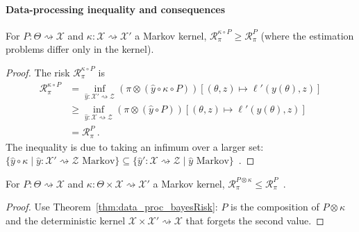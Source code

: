 \paragraph{Data-processing inequality and consequences}

\begin{theorem}
  \label{thm:data_proc_bayesRisk}
  \mathlibok
  For $P : \Theta \rightsquigarrow \mathcal X$ and $\kappa : \mathcal X \rightsquigarrow \mathcal X'$ a Markov kernel, $\mathcal R^{\kappa \circ P}_\pi \ge \mathcal R^{P}_\pi$ (where the estimation problems differ only in the kernel).
\end{theorem}

\begin{proof}\mathlibok
\uses{}
The risk $\mathcal R^{\kappa \circ P}_\pi$ is
\begin{align*}
\mathcal R^{\kappa \circ P}_\pi
&= \inf_{\hat{y} : \mathcal X' \rightsquigarrow \mathcal Z} (\pi \otimes (\hat{y} \circ \kappa \circ P))\left[(\theta, z) \mapsto \ell'(y(\theta), z)\right]
\\
&\ge \inf_{\hat{y} : \mathcal X \rightsquigarrow \mathcal Z} (\pi \otimes (\hat{y} \circ P))\left[(\theta, z) \mapsto \ell'(y(\theta), z)\right]
\\
&= \mathcal R^{P}_\pi
\: .
\end{align*}
The inequality is due to taking an infimum over a larger set: $\{\hat{y} \circ \kappa \mid \hat{y} : \mathcal X' \rightsquigarrow \mathcal Z \text{ Markov}\} \subseteq \{\hat{y}' : \mathcal X \rightsquigarrow \mathcal Z \mid \hat{y} \text{ Markov}\}$~.
\end{proof}

\begin{lemma}
  \label{lem:bayesRisk_compProd_le_fst}
  \mathlibok
  For $P : \Theta \rightsquigarrow \mathcal X$ and $\kappa : \Theta \times \mathcal X \rightsquigarrow \mathcal X'$ a Markov kernel, $\mathcal R^{P \otimes \kappa}_\pi \le \mathcal R^{P}_\pi$~.
\end{lemma}

\begin{proof}\mathlibok
{}
Use Theorem~\ref{thm:data_proc_bayesRisk}: $P$ is the composition of $P \otimes \kappa$ and the deterministic kernel $\mathcal X \times \mathcal X' \rightsquigarrow \mathcal X$ that forgets the second value.
\end{proof}

